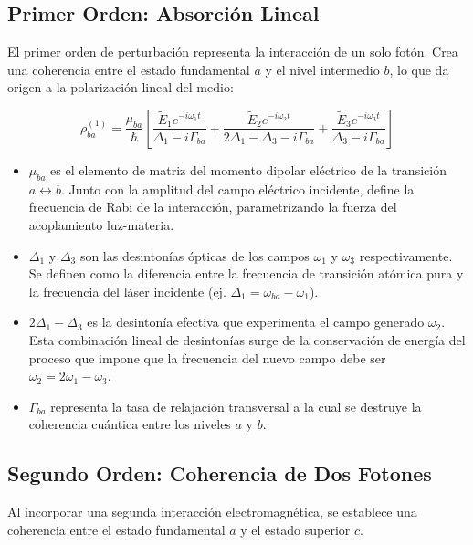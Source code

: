 \documentclass[12pt,a4paper]{article}
\begin{document}
\subsection*{Primer Orden: Absorción Lineal}
El primer orden de perturbación representa la interacción de un solo fotón. Crea una coherencia entre el estado fundamental $a$ y el nivel intermedio $b$, lo que da origen a la polarización lineal del medio:

\begin{equation}
\rho_{ba}^{(1)} = \frac{\mu_{ba}}{\hbar} \left[ \frac{\tilde{E}_1 e^{-i\omega_1 t}}{\Delta_1 - i\Gamma_{ba}} + \frac{\tilde{E}_2 e^{-i\omega_2 t}}{2\Delta_1 - \Delta_3 - i\Gamma_{ba}} + \frac{\tilde{E}_3 e^{-i\omega_3 t}}{\Delta_3 - i\Gamma_{ba}} \right] \tag{2}
\end{equation}

\begin{itemize}
    \item $\mu_{ba}$ es el elemento de matriz del momento dipolar eléctrico de la transición $a \leftrightarrow b$. Junto con la amplitud del campo eléctrico incidente, define la frecuencia de Rabi de la interacción, parametrizando la fuerza del acoplamiento luz-materia.
    
    \item $\Delta_1$ y $\Delta_3$ son las desintonías ópticas de los campos $\omega_1$ y $\omega_3$ respectivamente. Se definen como la diferencia entre la frecuencia de transición atómica pura y la frecuencia del láser incidente (ej. $\Delta_1 = \omega_{ba} - \omega_1$). 
    
    \item $2\Delta_1 - \Delta_3$ es la desintonía efectiva que experimenta el campo generado $\omega_2$. Esta combinación lineal de desintonías surge de la conservación de energía del proceso que impone que la frecuencia del nuevo campo debe ser $\omega_2 = 2\omega_1 - \omega_3$.
    
    \item $\Gamma_{ba}$ representa la tasa de relajación transversal a la cual se destruye la coherencia cuántica entre los niveles $a$ y $b$.
\end{itemize}

\subsection*{Segundo Orden: Coherencia de Dos Fotones}

Al incorporar una segunda interacción electromagnética, se establece una coherencia entre el estado fundamental $a$ y el estado superior $c$.
 
\end{document}
